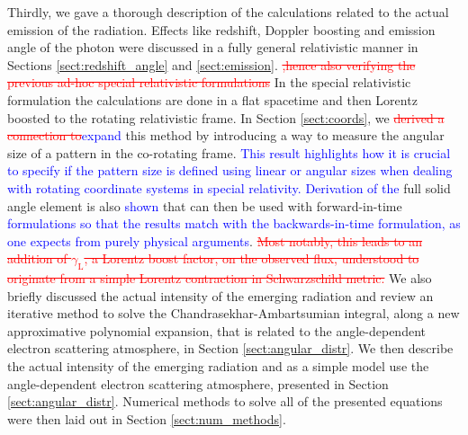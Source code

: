 \documentclass{aa}
\newcommand{\refe}[1]{\textcolor{blue}{{#1}}}
\newcommand{\refedel}[1]{\textcolor{red}{\sout{#1}}}
\newcommand{\sch}{Schwarzschild }
\newcommand{\lgamma}{\gamma_{\text{L}}}
\begin{document}
Thirdly, we gave a thorough description of the calculations related to the actual emission of the radiation.
Effects like redshift, Doppler boosting and emission angle of the photon were discussed in a fully general relativistic manner in Sections \ref{sect:redshift_angle} and \ref{sect:emission}. 
\refedel{,hence also verifying the previous ad-hoc special relativistic formulations}%
In the special relativistic formulation \citep[see e.g.,][]{PB06} the calculations are done in a flat spacetime and then Lorentz boosted to the rotating relativistic frame.
In Section \ref{sect:coords}, we \refedel{derived a connection to}\refe{expand} this method by introducing a way to measure the angular size of a pattern in the co-rotating frame.
\refe{This result highlights how it is crucial to specify if the pattern size is defined using linear or angular sizes when dealing with rotating coordinate systems in special relativity.}
\refe{Derivation of the} full solid angle element is also \refe{shown} that can then be used with forward-in-time \refe{formulations so that the results match with the backwards-in-time formulation, as one expects from purely physical arguments}.
\refedel{Most notably, this leads to an addition of $\lgamma$, a Lorentz boost factor, on the observed flux, understood to originate from a simple Lorentz contraction in \sch metric.}
We also briefly discussed the actual intensity of the emerging radiation and review an iterative method to solve the Chandrasekhar-Ambartsumian integral, along a new approximative polynomial expansion, that is related to the angle-dependent electron scattering atmosphere, in Section \ref{sect:angular_distr}.
We then describe the actual intensity of the emerging radiation and as a simple model use the angle-dependent electron scattering atmosphere, presented in Section \ref{sect:angular_distr}.
Numerical methods to solve all of the presented equations were then laid out in Section \ref{sect:num_methods}.
\end{document}
